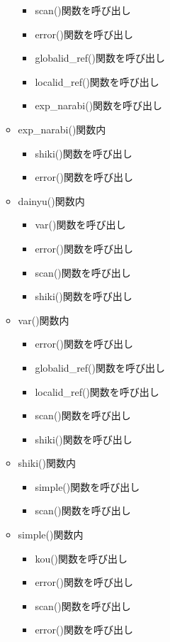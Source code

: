 \documentclass{jarticle}
\begin{document}
\begin{itemize}
\begin{itemize}
    \begin{itemize}
      \item scan()関数を呼び出し
      \item error()関数を呼び出し
      \item globalid\_ref()関数を呼び出し
      \item localid\_ref()関数を呼び出し
      \item exp\_narabi()関数を呼び出し
    \end{itemize}
    \item exp\_narabi()関数内
    \begin{itemize}
      \item shiki()関数を呼び出し
      \item error()関数を呼び出し
    \end{itemize}
    \item dainyu()関数内
    \begin{itemize}
      \item var()関数を呼び出し
      \item error()関数を呼び出し
      \item scan()関数を呼び出し
      \item shiki()関数を呼び出し
    \end{itemize}
    \item var()関数内
    \begin{itemize}
      \item error()関数を呼び出し
      \item globalid\_ref()関数を呼び出し
      \item localid\_ref()関数を呼び出し
      \item scan()関数を呼び出し
      \item shiki()関数を呼び出し
    \end{itemize}
    \item shiki()関数内
    \begin{itemize}
      \item simple()関数を呼び出し
      \item scan()関数を呼び出し
    \end{itemize}
    \item simple()関数内
    \begin{itemize}
      \item kou()関数を呼び出し
      \item error()関数を呼び出し
      \item scan()関数を呼び出し
      \item error()関数を呼び出し

\end{itemize}
\end{itemize}
\end{itemize}
\end{document}

